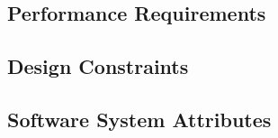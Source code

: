 \subsection{Performance Requirements}
\begin{itemize}
	
\end{itemize}
\subsection{Design Constraints}
\begin{enumerate}
	
\end{enumerate}
\subsection{Software System Attributes}



